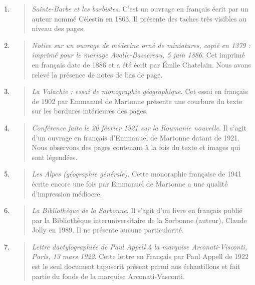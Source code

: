 \documentclass[a4paper,12pt,twoside]{book}
\begin{document}
\begin{enumerate}
\begin{quote}
\end{quote}	
\item
\begin{quote}
	
	\emph{Sainte-Barbe et les barbistes}. 
	C'est un ouvrage en français écrit par un auteur nommé Célestin en 1863. Il présente des taches très visibles au niveau des pages.
	
\end{quote}	
\item
\begin{quote}
	
	\emph{Notice sur un ouvrage de médecine orné de miniatures, copié en 1379 : imprimé pour le mariage Avalle-Bassereau, 5 juin 1886}.
	Cet imprimé en français date de 1886 et a été écrit par Émile Chatelain. Nous avons relevé la présence de notes de bas de page.
	
\end{quote}	
\item
\begin{quote}
	
	\emph{La Valachie : essai de monographie géographique}.
	Cet essai en français de 1902 par Emmanuel de Martonne présente une courbure du texte sur les bordures intérieures des pages.
	
\end{quote}	
\item
\begin{quote}
	
	\emph{Conférence faite le 20 février 1921 sur la Roumanie nouvelle}.
	Il s'agit d'un ouvrage en français d'Emmanuel de Martonne datant de 1921. Nous observons des pages contenant à la fois du texte et images qui sont légendées.
	
\end{quote}	
\item
\begin{quote}
	
	\emph{Les Alpes (géographie générale)}.	
	Cette monoraphie française de 1941 	écrite encore une fois par Emmanuel de Martonne a une qualité d'impression médiocre.
	
\end{quote}	
\item
\begin{quote}
	
	\emph{La Bibliothèque de la Sorbonne}.
	Il s'agit d'un livre en français publié par la	Bibliothèque interuniversitaire de la Sorbonne (auteur), Claude Jolly en 1989. Il ne présente aucune particularité.
	
\end{quote}	
\item
\begin{quote}
	
	\emph{Lettre dactylographiée de Paul Appell à la marquise Arconati-Visconti, Paris, 13 mars 1922}.
	Cette lettre en Français par Paul Appell de 1922 est le seul document tapuscrit présent parmi nos échantillons et fait partie du fonds de la marquise Arconati-Vasconti. \\
	
\end{quote}		
\end{enumerate}
	
\end{document}
